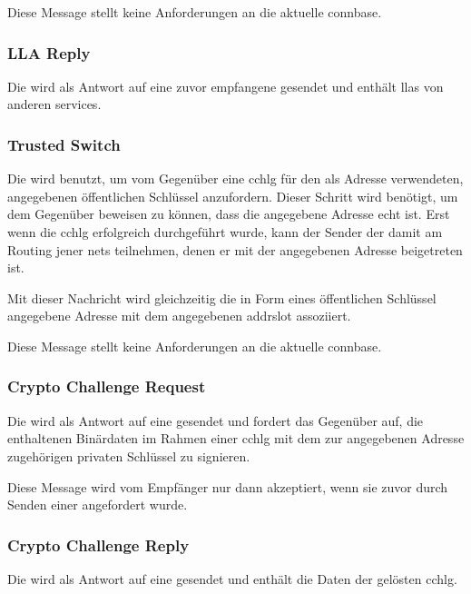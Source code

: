 Diese Message stellt keine Anforderungen an die aktuelle \gls{connbase}.

\isprotollareqbytefield


\subsubsection{LLA Reply}
\label{dcl-isproto-llarep}
Die \msg{\isprotollarep} wird als Antwort auf eine zuvor empfangene \msg{\isprotollareq} gesendet
und enthält \glspl{lla} von anderen \glspl{service}.

\isprotollarepbytefield


\subsubsection{Trusted Switch}
\label{dcl-isproto-ts}
Die \msg{\isprotots} wird benutzt, um vom Gegenüber eine \gls{cchlg} für den als Adresse verwendeten,
angegebenen öffentlichen Schlüssel anzufordern. Dieser Schritt wird benötigt, um dem Gegenüber beweisen
zu können, dass die angegebene Adresse echt ist. Erst wenn die \gls{cchlg} erfolgreich durchgeführt
wurde, kann der Sender der \msg{\isprotots} damit am Routing jener \glspl{net} teilnehmen, denen er
mit der angegebenen Adresse beigetreten ist.

Mit dieser Nachricht wird gleichzeitig die in Form eines öffentlichen Schlüssel angegebene Adresse
mit dem angegebenen \gls{addrslot} assoziiert.

Diese Message stellt keine Anforderungen an die aktuelle \gls{connbase}.

\isprototsbytefield


\subsubsection{Crypto Challenge Request}
\label{dcl-isproto-ccreq}
Die \msg{\isprotoccreq} wird als Antwort auf eine \msg{\isprotots} gesendet und fordert das Gegenüber
auf, die enthaltenen Binärdaten im Rahmen einer \gls{cchlg} mit dem zur angegebenen Adresse
zugehörigen privaten Schlüssel zu signieren.

Diese Message wird vom Empfänger nur dann akzeptiert, wenn sie zuvor durch Senden einer
\msg{\isprotots} angefordert wurde.

\isprotoccreqbytefield


\subsubsection{Crypto Challenge Reply}
\label{dcl-isproto-ccrep}
Die \msg{\isprotoccrep} wird als Antwort auf eine \msg{\isprotoccreq} gesendet und enthält die Daten
der gelösten \gls{cchlg}.

